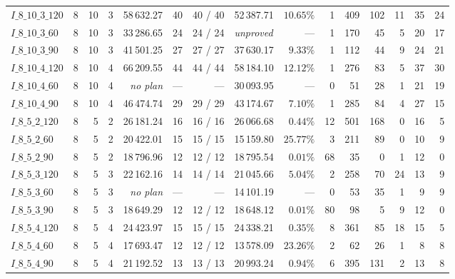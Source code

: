 \begin{table}[!htbp]
{\begin{tabular}{lrrrrrrlrrrrrrr}
$I\_8\_10\_3\_120$ & 8 & 10 & 3 & 58\,632.27 & 40 & 40 / 40 & 52\,387.71 & $10.65\%$ & 1 & 409 & 102 & 11 & 35 & 24 \\
$I\_8\_10\_3\_60$ & 8 & 10 & 3 & 33\,286.65 & 24 & 24 / 24 & \emph{unproved} & --- & 1 & 170 & 45 & 5 & 20 & 17 \\
$I\_8\_10\_3\_90$ & 8 & 10 & 3 & 41\,501.25 & 27 & 27 / 27 & 37\,630.17 & $9.33\%$ & 1 & 112 & 44 & 9 & 24 & 21 \\
$I\_8\_10\_4\_120$ & 8 & 10 & 4 & 66\,209.55 & 44 & 44 / 44 & 58\,184.10 & $12.12\%$ & 1 & 276 & 83 & 5 & 37 & 30 \\
$I\_8\_10\_4\_60$ & 8 & 10 & 4 & \emph{no plan} & --- & --- & 30\,093.95 & --- & 0 & 51 & 28 & 1 & 21 & 19 \\
$I\_8\_10\_4\_90$ & 8 & 10 & 4 & 46\,474.74 & 29 & 29 / 29 & 43\,174.67 & $7.10\%$ & 1 & 285 & 84 & 4 & 27 & 15 \\
$I\_8\_5\_2\_120$ & 8 & 5 & 2 & 26\,181.24 & 16 & 16 / 16 & 26\,066.68 & $0.44\%$ & 12 & 501 & 168 & 0 & 16 & 5 \\
$I\_8\_5\_2\_60$ & 8 & 5 & 2 & 20\,422.01 & 15 & 15 / 15 & 15\,159.80 & $25.77\%$ & 3 & 211 & 89 & 0 & 10 & 9 \\
$I\_8\_5\_2\_90$ & 8 & 5 & 2 & 18\,796.96 & 12 & 12 / 12 & 18\,795.54 & $0.01\%$ & 68 & 35 & 0 & 1 & 12 & 0 \\
$I\_8\_5\_3\_120$ & 8 & 5 & 3 & 22\,162.16 & 14 & 14 / 14 & 21\,045.66 & $5.04\%$ & 2 & 258 & 70 & 24 & 13 & 9 \\
$I\_8\_5\_3\_60$ & 8 & 5 & 3 & \emph{no plan} & --- & --- & 14\,101.19 & --- & 0 & 53 & 35 & 1 & 9 & 9 \\
$I\_8\_5\_3\_90$ & 8 & 5 & 3 & 18\,649.29 & 12 & 12 / 12 & 18\,648.12 & $0.01\%$ & 80 & 98 & 5 & 9 & 12 & 0 \\
$I\_8\_5\_4\_120$ & 8 & 5 & 4 & 24\,423.97 & 15 & 15 / 15 & 24\,338.21 & $0.35\%$ & 8 & 361 & 85 & 18 & 15 & 5 \\
$I\_8\_5\_4\_60$ & 8 & 5 & 4 & 17\,693.47 & 12 & 12 / 12 & 13\,578.09 & $23.26\%$ & 2 & 62 & 26 & 1 & 8 & 8 \\
$I\_8\_5\_4\_90$ & 8 & 5 & 4 & 21\,192.52 & 13 & 13 / 13 & 20\,993.24 & $0.94\%$ & 6 & 395 & 131 & 2 & 13 & 8 \\
\bottomrule
\end{tabular}}
\end{table}

